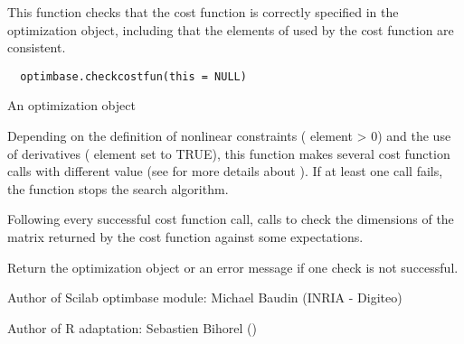 %
\begin{Description}\relax
This function checks that the cost function is correctly specified in the
optimization object, including that the elements of  used by the
cost function are consistent.
\end{Description}
%
\begin{Usage}
\begin{verbatim}
  optimbase.checkcostfun(this = NULL)
\end{verbatim}
\end{Usage}
%
\begin{Arguments}
\begin{ldescription}
\item[\code{this}] An optimization object
\end{ldescription}
\end{Arguments}
%
\begin{Details}\relax
Depending on the definition of nonlinear constraints (
element > 0) and the use of derivatives ( element set to
TRUE), this function makes several cost function calls with different
 value (see  for
more details about ). If  at least one call fails, the function
stops the search algorithm.

Following every successful cost function call, 
calls  to check the dimensions of the matrix
returned by the cost function against some expectations.
\end{Details}
%
\begin{Value}
Return the optimization object or an error message if one check is not
successful.
\end{Value}
%
\begin{Author}\relax
Author of Scilab optimbase module: Michael Baudin (INRIA - Digiteo)

Author of R adaptation: Sebastien Bihorel ()
\end{Author}
%
\begin{SeeAlso}\relax
{}
\end{SeeAlso}
